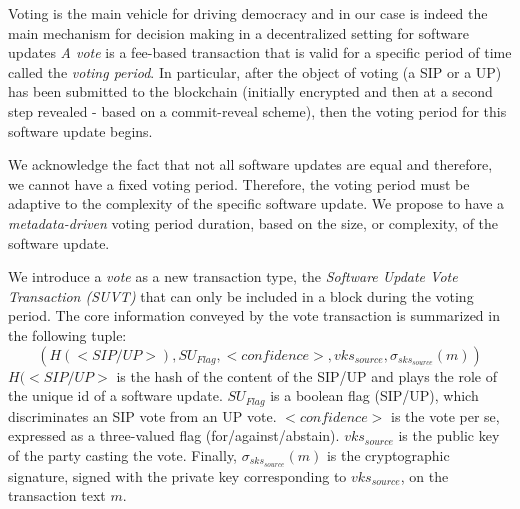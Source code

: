 Voting is the main vehicle for driving democracy and in our case is indeed the main mechanism for decision making in a decentralized setting for software updates
\emph{A vote} is a fee-based transaction that is valid for a specific period of time called the \emph{voting period}. In particular, after the object of voting (a SIP or a UP) has been submitted to the blockchain (initially encrypted and then at a second step revealed - based on a commit-reveal scheme),%
then the voting period for this software update begins. 

We acknowledge the fact that not all software updates are equal and therefore, we cannot have a fixed voting period. %
Therefore, the voting period must be adaptive to the complexity of the specific software update. We propose to have a \emph{metadata-driven} voting period duration, based on the size, or complexity, of the software update.%

We introduce a \emph{vote} as a new transaction type, the \emph{Software Update Vote Transaction (SUVT)} that can only be included in a block during the voting period. The core information conveyed by the vote transaction is summarized in the following tuple:
$$( H(<SIP/UP>),SU_{Flag},<confidence>,vks_{source},\sigma_{sks_{source}}(m))$$
$H(<SIP/UP>$ is the hash of the content of the SIP/UP and plays the role of the unique id of a software update. $SU_{Flag}$ is a boolean flag (SIP/UP), which discriminates an SIP vote from an UP vote. $<confidence>$ is the vote per se, expressed as a three-valued flag (for/against/abstain). $vks_{source}$ is the public key of the party casting the vote. Finally, $\sigma_{sks_{source}}(m)$ is the cryptographic signature, signed with the private key corresponding to $vks_{source}$, on the transaction text $m$.

